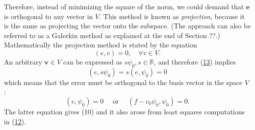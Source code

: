 \documentclass[../main.tex]{subfiles}
\begin{document}
Therefore, instead of minimizing the square of the norm, we could demand that $\boldsymbol{e}$ is orthogonal to any vector in $V$. This method is known as \textit{projection}, because it is the same as projecting the vector onto the subspace. (The approach can also be referred to as a Galerkin method as explained at the end of Section ??.)
Mathematically the projection method is stated by the equation
\begin{equation}\label{eqa13}
	(e, v)=0, \quad \forall v \in V.
\end{equation}
An arbitrary $\boldsymbol{v} \in V$ can be expressed as $s \psi_{0}, s \in \mathbb{R}$, and therefore (\hyperref[eqa13]{13}) implies
$$
\left(e, s \psi_{0}\right)=s\left(e, \psi_{0}\right)=0
$$
which means that the error must be orthogonal to the basis vector in the space $V$ :
$$
\left(e, \psi_{0}\right)=0 \quad \text { or } \quad\left(f-c_{0} \psi_{0}, \psi_{0}\right)=0.
$$
The latter equation gives (10) and it also arose from least squares computations in (\hyperref[eqa12]{12}).
\end{document}
